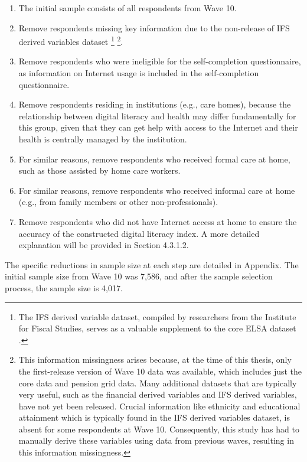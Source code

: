 \begin{enumerate}
    \item The initial sample consists of all respondents from Wave 10.
    \item Remove respondents missing key information due to the non-release of IFS derived variables dataset \footnote{The IFS derived variable dataset, compiled by researchers from the Institute for Fiscal Studies, serves as a valuable supplement to the core ELSA dataset \parencite{ifs_english_2022}.} \footnote{This information missingness arises because, at the time of this thesis, only the first-release version of Wave 10 data was available, which includes just the core data and pension grid data. Many additional datasets that are typically very useful, such as the financial derived variables and IFS derived variables, have not yet been released. Crucial information like ethnicity and educational attainment which is typically found in the IFS derived variables dataset, is absent for some respondents at Wave 10. Consequently, this study has had to manually derive these variables using data from previous waves, resulting in this information missingness.}.
    \item Remove respondents who were ineligible for the self-completion questionnaire, as information on Internet usage is included in the self-completion questionnaire.
    \item Remove respondents residing in institutions (e.g., care homes), because the relationship between digital literacy and health may differ fundamentally for this group, given that they can get help with access to the Internet and their health is centrally managed by the institution.
    \item For similar reasons, remove respondents who received formal care at home, such as those assisted by home care workers.
    \item For similar reasons, remove respondents who received informal care at home (e.g., from family members or other non-professionals).
    \item Remove respondents who did not have Internet access at home to ensure the accuracy of the constructed digital literacy index. A more detailed explanation will be provided in Section 4.3.1.2.
\end{enumerate}

The specific reductions in sample size at each step are detailed in Appendix. The initial sample size from Wave 10 was 7,586, and after the sample selection process, the sample size is 4,017.


